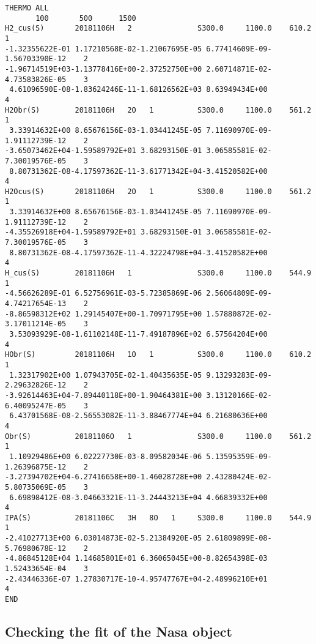 \documentclass[11pt]{article}
\begin{document}
    \begin{verbatim}
THERMO ALL
       100       500      1500
H2_cus(S)       20181106H   2               S300.0     1100.0    610.2         1
-1.32355622E-01 1.17210568E-02-1.21067695E-05 6.77414609E-09-1.56703390E-12    2
-1.96714519E+03-1.13778416E+00-2.37252750E+00 2.60714871E-02-4.73583826E-05    3
 4.61096590E-08-1.83624246E-11-1.68126562E+03 8.63949434E+00                   4
H2Obr(S)        20181106H   2O   1          S300.0     1100.0    561.2         1
 3.33914632E+00 8.65676156E-03-1.03441245E-05 7.11690970E-09-1.91112739E-12    2
-3.65073462E+04-1.59589792E+01 3.68293150E-01 3.06585581E-02-7.30019576E-05    3
 8.80731362E-08-4.17597362E-11-3.61771342E+04-3.41520582E+00                   4
H2Ocus(S)       20181106H   2O   1          S300.0     1100.0    561.2         1
 3.33914632E+00 8.65676156E-03-1.03441245E-05 7.11690970E-09-1.91112739E-12    2
-4.35526918E+04-1.59589792E+01 3.68293150E-01 3.06585581E-02-7.30019576E-05    3
 8.80731362E-08-4.17597362E-11-4.32224798E+04-3.41520582E+00                   4
H_cus(S)        20181106H   1               S300.0     1100.0    544.9         1
-4.56626289E-01 6.52756961E-03-5.72385869E-06 2.56064809E-09-4.74217654E-13    2
-8.86598312E+02 1.29145407E+00-1.70971795E+00 1.57880872E-02-3.17011214E-05    3
 3.53093929E-08-1.61102148E-11-7.49187896E+02 6.57564204E+00                   4
HObr(S)         20181106H   1O   1          S300.0     1100.0    610.2         1
 1.32317902E+00 1.07943705E-02-1.40435635E-05 9.13293283E-09-2.29632826E-12    2
-3.92614463E+04-7.89440118E+00-1.90464381E+00 3.13120166E-02-6.40095247E-05    3
 6.43701568E-08-2.56553082E-11-3.88467774E+04 6.21680636E+00                   4
Obr(S)          20181106O   1               S300.0     1100.0    561.2         1
 1.10929486E+00 6.02227730E-03-8.09582034E-06 5.13595359E-09-1.26396875E-12    2
-3.27394702E+04-6.27416658E+00-1.46028728E+00 2.43280424E-02-5.80735069E-05    3
 6.69898412E-08-3.04663321E-11-3.24443213E+04 4.66839332E+00                   4
IPA(S)          20181106C   3H   8O   1     S300.0     1100.0    544.9         1
-2.41027713E+00 6.03014873E-02-5.21384920E-05 2.61809899E-08-5.76980678E-12    2
-4.86845128E+04 1.14685801E+01 6.36065045E+00-8.82654398E-03 1.52433654E-04    3
-2.43446336E-07 1.27830717E-10-4.95747767E+04-2.48996210E+01                   4
END
\end{verbatim}

    \subsection{Checking the fit of the Nasa
object}\label{checking-the-fit-of-the-nasa-object}
\end{document}
